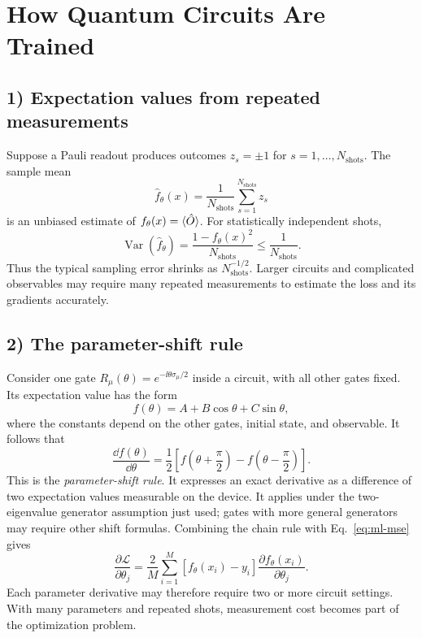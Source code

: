 \section{How Quantum Circuits Are Trained}
\subsection*{1) Expectation values from repeated measurements}
Suppose a Pauli readout produces outcomes $z_s=\pm1$ for $s=1,\ldots,N_{\mathrm{shots}}$. The sample mean
\begin{equation}
 \widehat f_\theta(x)=\frac1{N_{\mathrm{shots}}}\sum_{s=1}^{N_{\mathrm{shots}}}z_s
\end{equation}
is an unbiased estimate of $f_\theta(x)=\langle\hat{O}\rangle$. For statistically independent shots,
\begin{equation}
 \operatorname{Var}(\widehat f_\theta)=\frac{1-f_\theta(x)^2}{N_{\mathrm{shots}}}
\le\frac1{N_{\mathrm{shots}}}.
\end{equation}
Thus the typical sampling error shrinks as $N_{\mathrm{shots}}^{-1/2}$. Larger circuits and complicated observables may require many repeated measurements to estimate the loss and its gradients accurately.

\subsection*{2) The parameter-shift rule}
Consider one gate $R_\mu(\theta)=e^{-\ii\theta\sigma_\mu/2}$ inside a circuit, with all other gates fixed. Its expectation value has the form
\begin{equation}
f(\theta)=A+B\cos\theta+C\sin\theta,
\end{equation}
where the constants depend on the other gates, initial state, and observable. It follows that
\begin{equation}\label{eq:qnn-shift}
\boxed{\frac{\dd f(\theta)}{\dd\theta}=
\frac12\left[f\left(\theta+\frac\pi2\right)
-f\left(\theta-\frac\pi2\right)\right].}
\end{equation}
This is the \emph{parameter-shift rule}. It expresses an exact derivative as a difference of two expectation values measurable on the device. It applies under the two-eigenvalue generator assumption just used; gates with more general generators may require other shift formulas. Combining the chain rule with Eq.~\eqref{eq:ml-mse} gives
\begin{equation}
\frac{\partial\mathcal L}{\partial\theta_j}=
\frac2M\sum_{i=1}^M[f_\theta(x_i)-y_i]
\frac{\partial f_\theta(x_i)}{\partial\theta_j}.
\end{equation}
Each parameter derivative may therefore require two or more circuit settings. With many parameters and repeated shots, measurement cost becomes part of the optimization problem.


